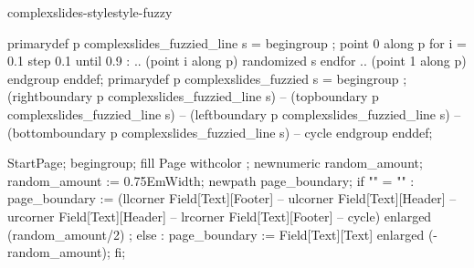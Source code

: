 \startmodule complexslides-stylestyle-fuzzy

\unprotect

\setupheader[\c!style=\bf\ssc, \c!color=base:0, \c!align=\v!middle]
\setupfooter[\c!style=small]

\setupheadertexts[{\getmarking[section]}]





\startMPdefinitions
  primarydef p complexslides_fuzzied_line s =
     begingroup ;
     point 0 along p 
        for i = 0.1 step 0.1 until 0.9 :
           .. (point i along p) randomized s
        endfor
           .. (point 1 along p)
     endgroup
  enddef;
  primarydef p complexslides_fuzzied s =
     begingroup ;
       (rightboundary  p complexslides_fuzzied_line s)
        -- (topboundary    p complexslides_fuzzied_line s)
        -- (leftboundary   p complexslides_fuzzied_line s)
        -- (bottomboundary p complexslides_fuzzied_line s)
        -- cycle
     endgroup
  enddef;
\stopMPdefinitions

  StartPage;
  begingroup;
  fill Page withcolor ;
  newnumeric random_amount; random_amount := 0.75EmWidth;
  newpath page_boundary; 
  if "\currentmakeup" = "" :
      page_boundary := (llcorner Field[Text][Footer]
                     -- ulcorner Field[Text][Header]
                     -- urcorner Field[Text][Header]
                     -- lrcorner Field[Text][Footer]
                     -- cycle)
                     enlarged (random_amount/2) ;
  else :
      page_boundary := Field[Text][Text] enlarged (-random_amount);
  fi;


